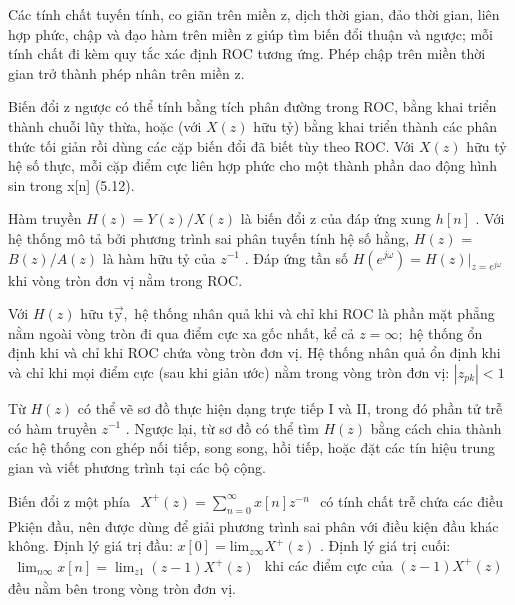 \documentclass[
  10
]{article}
\begin{document}
Các tính chất tuyến tính, co giãn trên miền z, dịch thời gian, đảo thời
gian, liên hợp phức, chập và đạo hàm trên miền z giúp tìm biến đổi thuận
và ngược; mỗi tính chất đi kèm quy tắc xác định ROC tương ứng. Phép chập
trên miền thời gian trở thành phép nhân trên miền z.

Biến đổi z ngược có thể tính bằng tích phân đường trong ROC, bằng khai
triển thành chuỗi lũy thừa, hoặc (với \(X ( z )\) hữu tỷ) bằng khai
triển thành các phân thức tối giản rồi dùng các cặp biến đổi đã biết tùy
theo ROC. Với \(X ( z )\) hữu tỷ hệ số thực, mỗi cặp điểm cực liên hợp
phức cho một thành phần dao động hình sin trong x{[}n{]} (5.12).

Hàm truyền \(H ( z ) = Y ( z ) / X ( z )\) là biến đổi z của đáp ứng
xung \(h [ n ]\) . Với hệ thống mô tả bởi phương trình sai phân tuyến
tính hệ số hằng, \(H ( z )\) = \(B ( z ) / A ( z )\) là hàm hữu tỷ của
\(z ^ { - 1 }\) . Đáp ứng tần số
\(H ( e ^ { j \omega } ) = H ( z ) | _ { z = e ^ { j \omega } }\) khi
vòng tròn đơn vị nằm trong ROC.

Với \(H ( z )\) hữu \(\mathrm { t { \vec { y } } , }\) hệ thống nhân quả
khi và chỉ khi ROC là phần mặt phẳng nằm ngoài vòng tròn đi qua điểm cực
xa gốc nhất, kể cả \(z = \infty ;\) hệ thống ổn định khi và chỉ khi ROC
chứa vòng tròn đơn vị. Hệ thống nhân quả ổn định khi và chỉ khi mọi điểm
cực (sau khi giản ước) nằm trong vòng tròn đơn vị:
\(| z _ { p k } | < 1\)

Từ \(H ( z )\) có thể vẽ sơ đồ thực hiện dạng trực tiếp I và II, trong
đó phần tử trễ có hàm truyền \(z ^ { - 1 }\) . Ngược lại, từ sơ đồ có
thể tìm \(H ( z )\) bằng cách chia thành các hệ thống con ghép nối tiếp,
song song, hồi tiếp, hoặc đặt các tín hiệu trung gian và viết phương
trình tại các bộ cộng.

Biến đổi z một phía
\(\begin{array} { r } { X ^ { + } ( z ) = \sum _ { n = 0 } ^ { \infty } x [ n ] z ^ { - n } } \end{array}\)
có tính chất trễ chứa các điều Pkiện đầu, nên được dùng để giải phương
trình sai phân với điều kiện đầu khác không. Định lý giá trị đầu:
\(x [ 0 ] = \mathrm { l i m } _ { z  \infty } X ^ { + } ( z )\) . Định
lý giá trị cuối:
\(\begin{array} { r } { \operatorname* { l i m } _ { n  \infty } x [ n ] = \operatorname* { l i m } _ { z  1 } ( z - 1 ) X ^ { + } ( z ) } \end{array}\)
khi các điểm cực của \(( z - 1 ) X ^ { + } ( z )\) đều nằm bên trong
vòng tròn đơn vị.
\end{document}
